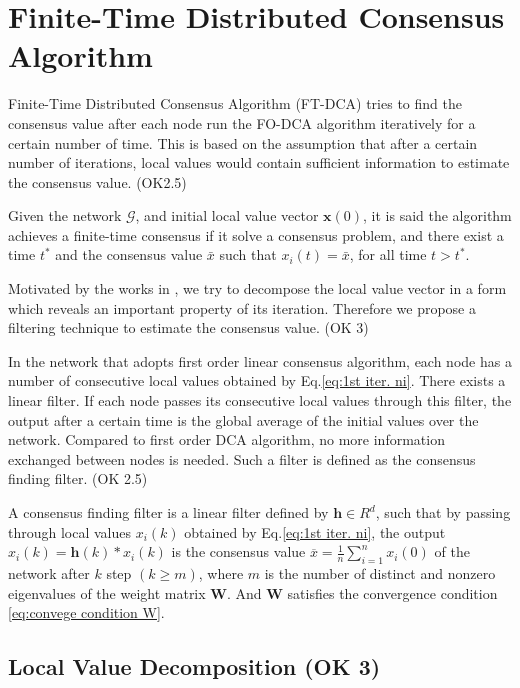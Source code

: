 
\section{\label{sec:Finite-Time-Distributed-Consensu}Finite-Time Distributed
Consensus Algorithm}

Finite-Time Distributed Consensus Algorithm (FT-DCA) tries to find
the consensus value after each node run the FO-DCA algorithm iteratively
for a certain number of time. This is based on the assumption that
after a certain number of iterations, local values would contain sufficient
information to estimate the consensus value. (OK2.5)
\begin{defn}
Given the network $\mathcal{G}$, and initial local value vector $\mathbf{x}\left(0\right)$,
it is said the algorithm achieves a finite-time consensus if it solve
a consensus problem, and there exist a time $t^{*}$ and the consensus
value $\bar{x}$ such that $x_{i}\left(t\right)=\bar{x}$, for all
time $t>t^{*}$. 
\end{defn}
Motivated by the works in \cite{Kokiopoulou2007}, we try to decompose
the local value vector in a form which reveals an important property
of its iteration. Therefore we propose a filtering technique to estimate
the consensus value. (OK 3) 

In the network that adopts first order linear consensus algorithm,
each node has a number of consecutive local values obtained by Eq.\eqref{eq:1st iter. ni}.
There exists a linear filter. If each node passes its consecutive
local values through this filter, the output after a certain time
is the global average of the initial values over the network. Compared
to first order DCA algorithm, no more information exchanged between
nodes is needed. Such a filter is defined as the consensus finding
filter. (OK 2.5) 
\begin{defn}
\label{Def.A-consensus-finding}A consensus finding filter is a linear
filter defined by $\mathbf{h}\in R^{d}$, such that by passing through
local values $x_{i}(k)$ obtained by Eq.\eqref{eq:1st iter. ni},
the output $\hat{x}_{i}(k)=\mathbf{h}(k)*x_{i}(k)$ is the consensus
value $\overline{x}=\frac{1}{n}\sum_{i=1}^{n}x_{i}(0)$ of the network
after $k$ step $\left(k\geqslant m\right)$, where $m$ is the number
of distinct and nonzero eigenvalues of the weight matrix $\mathbf{W}$.
And $\mathbf{W}$ satisfies the convergence condition \ref{eq:convege condition W}.
\end{defn}

\subsection{\label{sub:Local-Value-Decomposition}Local Value Decomposition (OK
3)}


